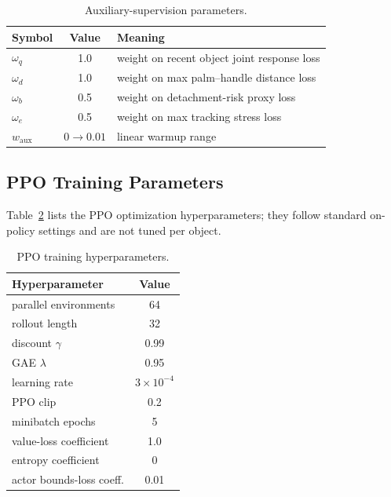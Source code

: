 \begin{table}[ht]
\centering
\caption{Auxiliary-supervision parameters.}
\label{tab:auxhp}
\small
\begin{tabular}{lcl}
\toprule
Symbol & Value & Meaning \\
\midrule
$\omega_q$         & 1.0 & weight on recent object joint response loss \\
$\omega_d$         & 1.0 & weight on max palm--handle distance loss \\
$\omega_b$         & 0.5 & weight on detachment-risk proxy loss \\
$\omega_e$         & 0.5 & weight on max tracking stress loss \\
$w_{\mathrm{aux}}$ & $0\rightarrow 0.01$ & linear warmup range \\
\bottomrule
\end{tabular}
\end{table}


\subsection{PPO Training Parameters}
\label{app:ppohp}

Table~\ref{tab:ppohp} lists the PPO optimization hyperparameters; they
follow standard on-policy settings and are not tuned per object.

\begin{table}[ht]
\centering
\caption{PPO training hyperparameters.}
\label{tab:ppohp}
\small
\begin{tabular}{lc}
\toprule
Hyperparameter & Value \\
\midrule
parallel environments     & 64 \\
rollout length            & 32 \\
discount $\gamma$         & 0.99 \\
GAE $\lambda$             & 0.95 \\
learning rate             & $3\times 10^{-4}$ \\
PPO clip                  & 0.2 \\
minibatch epochs          & 5 \\
value-loss coefficient    & 1.0 \\
entropy coefficient       & 0 \\
actor bounds-loss coeff.  & 0.01 \\
\bottomrule
\end{tabular}
\end{table}


